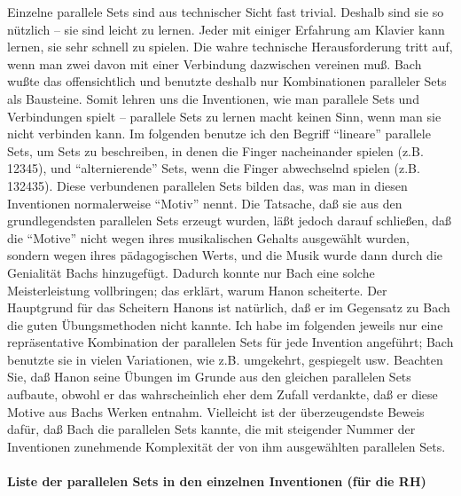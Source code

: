 Einzelne parallele Sets sind aus technischer Sicht fast trivial.
Deshalb sind sie so nützlich -- sie sind leicht zu lernen.
Jeder mit einiger Erfahrung am Klavier kann lernen, sie sehr schnell zu spielen.
Die wahre technische Herausforderung tritt auf, wenn man zwei davon mit einer Verbindung dazwischen vereinen muß.
Bach wußte das offensichtlich und benutzte deshalb nur Kombinationen paralleler Sets als Bausteine.
Somit lehren uns die Inventionen, wie man parallele Sets und Verbindungen spielt -- parallele Sets zu lernen macht keinen Sinn, wenn man sie nicht verbinden kann.
Im folgenden benutze ich den Begriff \enquote{lineare} parallele Sets, um Sets zu beschreiben, in denen die Finger nacheinander spielen (z.B. 12345), und \enquote{alternierende} Sets, wenn die Finger abwechselnd spielen (z.B. 132435).
Diese verbundenen parallelen Sets bilden das, was man in diesen Inventionen normalerweise \enquote{Motiv} nennt.
Die Tatsache, daß sie aus den grundlegendsten parallelen Sets erzeugt wurden, läßt jedoch darauf schließen, daß die \enquote{Motive} nicht wegen ihres musikalischen Gehalts ausgewählt wurden, sondern wegen ihres pädagogischen Werts, und die Musik wurde dann durch die Genialität Bachs hinzugefügt.
Dadurch konnte nur Bach eine solche Meisterleistung vollbringen; das erklärt, warum Hanon scheiterte.
Der Hauptgrund für das Scheitern Hanons ist natürlich, daß er im Gegensatz zu Bach die guten Übungsmethoden nicht kannte.
Ich habe im folgenden jeweils nur eine repräsentative Kombination der parallelen Sets für jede Invention angeführt; Bach benutzte sie in vielen Variationen, wie z.B. umgekehrt, gespiegelt usw.
Beachten Sie, daß Hanon seine Übungen im Grunde aus den gleichen parallelen Sets aufbaute, obwohl er das wahrscheinlich eher dem Zufall verdankte, daß er diese Motive aus Bachs Werken entnahm.
Vielleicht ist der überzeugendste Beweis dafür, daß Bach die parallelen Sets kannte, die mit steigender Nummer der Inventionen zunehmende Komplexität der von ihm ausgewählten parallelen Sets.


\paragraph{Liste der parallelen Sets in den einzelnen Inventionen (für die RH)}
\label{c1iii20ps}

